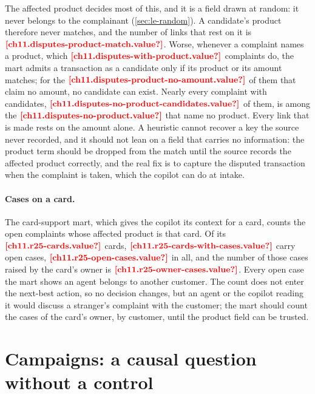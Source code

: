 The affected product decides most of this, and it is a field drawn at random: it never belongs to the complainant
(\cref{sec:le-random}). A candidate's product therefore never matches, and the number of links that rest on it is
$\est{ch11.disputes-product-match}{value}$. Worse, whenever a complaint names a product, which
$\est{ch11.disputes-with-product}{value}$ complaints do, the mart admits a transaction as a candidate only if its product
or its amount matches; for the $\est{ch11.disputes-product-no-amount}{value}$ of them that claim no amount, no candidate can
exist. Nearly every complaint with candidates, $\est{ch11.disputes-no-product-candidates}{value}$ of them, is among the
$\est{ch11.disputes-no-product}{value}$ that name no product. Every link that is made rests on the amount alone. A
heuristic cannot recover a key the source never recorded, and it should not lean on a field that carries no
information: the product term should be dropped from the match until the source records the affected product
correctly, and the real fix is to capture the disputed transaction when the complaint is taken, which the copilot can do
at intake.

\paragraph{Cases on a card.} The card-support mart, which gives the copilot its context for a card, counts the open
complaints whose affected product is that card. Of its $\est{ch11.r25-cards}{value}$ cards,
$\est{ch11.r25-cards-with-cases}{value}$ carry open cases, $\est{ch11.r25-open-cases}{value}$ in all, and the number of
those cases raised by the card's owner is $\est{ch11.r25-owner-cases}{value}$. Every open case the mart shows an agent
belongs to another customer. The count does not enter the next-best action, so no decision changes, but an agent or the
copilot reading it would discuss a stranger's complaint with the customer; the mart should count the cases of the card's
owner, by customer, until the product field can be trusted.

\section{Campaigns: a causal question without a control}\label{sec:mf-campaigns}

